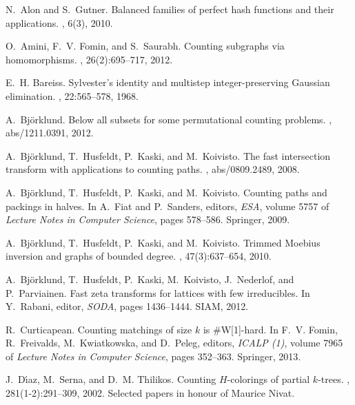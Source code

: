 \documentclass{amsart}
\begin{document}

\begin{thebibliography}{10}

N.~Alon and S.~Gutner.
\newblock Balanced families of perfect hash functions and their applications.
, 6(3), 2010.

O.~Amini, F.~V. Fomin, and S.~Saurabh.
\newblock Counting subgraphs via homomorphisms.
, 26(2):695--717, 2012.

E.~H. Bareiss.
\newblock Sylvester's identity and multistep integer-preserving {G}aussian
  elimination.
, 22:565--578, 1968.

A.~Bj\"orklund.
\newblock Below all subsets for some permutational counting problems.
, abs/1211.0391, 2012.

A.~Bj{\"o}rklund, T.~Husfeldt, P.~Kaski, and M.~Koivisto.
\newblock The fast intersection transform with applications to counting paths.
, abs/0809.2489, 2008.

A.~Bj{\"o}rklund, T.~Husfeldt, P.~Kaski, and M.~Koivisto.
\newblock Counting paths and packings in halves.
\newblock In A.~Fiat and P.~Sanders, editors, {\em ESA}, volume 5757 of {\em
  Lecture Notes in Computer Science}, pages 578--586. Springer, 2009.

A.~Bj{\"o}rklund, T.~Husfeldt, P.~Kaski, and M.~Koivisto.
\newblock Trimmed {M}oebius inversion and graphs of bounded degree.
, 47(3):637--654, 2010.

A.~Bj{\"o}rklund, T.~Husfeldt, P.~Kaski, M.~Koivisto, J.~Nederlof, and
  P.~Parviainen.
\newblock Fast zeta transforms for lattices with few irreducibles.
\newblock In Y.~Rabani, editor, {\em SODA}, pages 1436--1444. SIAM, 2012.

R.~Curticapean.
\newblock Counting matchings of size $k$ is {\#}{W}[1]-hard.
\newblock In F.~V. Fomin, R.~Freivalds, M.~Kwiatkowska, and D.~Peleg, editors,
  {\em ICALP (1)}, volume 7965 of {\em Lecture Notes in Computer Science},
  pages 352--363. Springer, 2013.

J.~D{\'{\i}}az, M.~Serna, and D.~M. Thilikos.
\newblock Counting {$H$}-colorings of partial {$k$}-trees.
, 281(1-2):291--309, 2002.
\newblock Selected papers in honour of Maurice Nivat.


\end{thebibliography}
\end{document}
